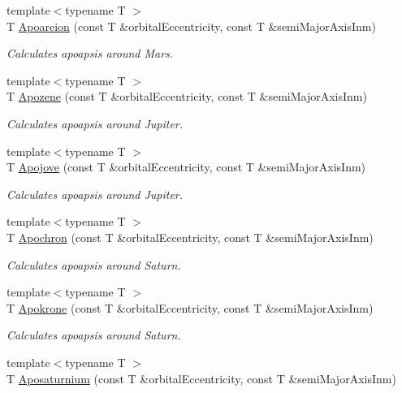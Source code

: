 \begin{DoxyCompactItemize}
{\footnotesize template$<$typename T $>$ }\\T \mbox{\hyperlink{group___e_g_x_phys-_apoapsis_ga8a44d21df90f3e6e9168b871a5b7f26b}{Apoareion}} (const T \&orbital\+Eccentricity, const T \&semi\+Major\+Axis\+Inm)
\begin{DoxyCompactList}\small\item\em Calculates apoapsis around Mars. \end{DoxyCompactList}\item 
{\footnotesize template$<$typename T $>$ }\\T \mbox{\hyperlink{group___e_g_x_phys-_apoapsis_ga2de1f63be8e4e22f219c4e947588a207}{Apozene}} (const T \&orbital\+Eccentricity, const T \&semi\+Major\+Axis\+Inm)
\begin{DoxyCompactList}\small\item\em Calculates apoapsis around Jupiter. \end{DoxyCompactList}\item 
{\footnotesize template$<$typename T $>$ }\\T \mbox{\hyperlink{group___e_g_x_phys-_apoapsis_gad2a2021d43526fc752fe87beff789b28}{Apojove}} (const T \&orbital\+Eccentricity, const T \&semi\+Major\+Axis\+Inm)
\begin{DoxyCompactList}\small\item\em Calculates apoapsis around Jupiter. \end{DoxyCompactList}\item 
{\footnotesize template$<$typename T $>$ }\\T \mbox{\hyperlink{group___e_g_x_phys-_apoapsis_gac978de20a08121198f73637018c80eee}{Apochron}} (const T \&orbital\+Eccentricity, const T \&semi\+Major\+Axis\+Inm)
\begin{DoxyCompactList}\small\item\em Calculates apoapsis around Saturn. \end{DoxyCompactList}\item 
{\footnotesize template$<$typename T $>$ }\\T \mbox{\hyperlink{group___e_g_x_phys-_apoapsis_ga572bf783c39ce472a06e89063f1fd1a7}{Apokrone}} (const T \&orbital\+Eccentricity, const T \&semi\+Major\+Axis\+Inm)
\begin{DoxyCompactList}\small\item\em Calculates apoapsis around Saturn. \end{DoxyCompactList}\item 
{\footnotesize template$<$typename T $>$ }\\T \mbox{\hyperlink{group___e_g_x_phys-_apoapsis_gabb69067baa611c8bda701d7040cc47b6}{Aposaturnium}} (const T \&orbital\+Eccentricity, const T \&semi\+Major\+Axis\+Inm)

\end{DoxyCompactItemize}

